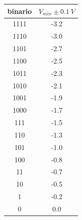 \documentclass[journal]{IEEEtran}
\begin{document}
\begin{appendices}
\begin{tabular}{cc}
binario & $V_{min}  \pm 0.1 \ V$ \\ \hline
1111    & -3.2                  \\
1110    & -3.0                  \\
1101    & -2.7                  \\
1100    & -2.5                  \\
1011    & -2.3                  \\
1010    & -2.1                  \\
1001    & -1.9                  \\
1000    & -1.7                  \\
111     & -1.5                  \\
110     & -1.3                  \\
101     & -1.0                  \\
100     & -0.8                  \\
11      & -0.7                  \\
10      & -0.5                  \\
1       & -0.2                  \\
0       & 0.0
\vspace{5 mm}
\label{tab:calibrazione_adc}
\end{tabular}


\end{appendices}


\clearpage
\newpage

\tableofcontents %

\newpage

\printbibliography %
\end{document}
